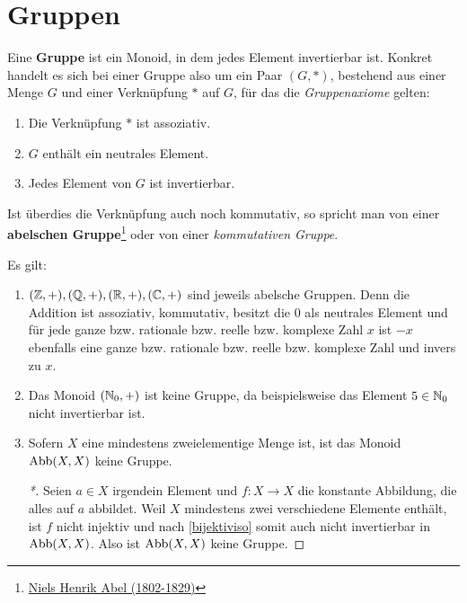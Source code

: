 \section{Gruppen}


\begin{defin}[Gruppe]  
    Eine \textbf{Gruppe} ist ein Monoid, in dem jedes Element invertierbar ist. Konkret handelt es sich bei einer Gruppe also um ein Paar $(G,*)$, bestehend aus einer Menge $G$ und einer Verknüpfung $*$ auf $G$, für das die \emph{Gruppenaxiome} gelten:
    \begin{enumerate}[(G1), labelindent=1.5em, leftmargin=*]
        \item Die Verknüpfung $*$ ist assoziativ.
        \item $G$ enthält ein neutrales Element.
        \item Jedes Element von $G$ ist invertierbar.
    \end{enumerate}
    Ist überdies die Verknüpfung auch noch kommutativ, so spricht man von einer \textbf{abelschen Gruppe}\footnote{\href{https://de.wikipedia.org/wiki/Niels_Henrik_Abel}{Niels Henrik Abel (1802-1829)}} oder von einer \emph{kommutativen Gruppe}.
\end{defin}


\begin{bsp}
    Es gilt:
    \begin{enumerate}
        \item $(\mathbb Z,+),(\mathbb Q,+),(\mathbb R,+),(\mathbb C,+)$ sind jeweils abelsche Gruppen. Denn die Addition ist assoziativ, kommutativ, besitzt die $0$ als neutrales Element und für jede ganze bzw. rationale bzw. reelle bzw. komplexe Zahl $x$ ist $-x$ ebenfalls eine ganze bzw. rationale bzw. reelle bzw. komplexe Zahl und invers zu $x$.
        \item Das Monoid $(\mathbb N_0,+)$ ist keine Gruppe, da beispielsweise das Element $5\in \mathbb N_0$ nicht invertierbar ist.
        \item Sofern $X$ eine mindestens zweielementige Menge ist, ist das Monoid $\operatorname{Abb}(X,X)$ keine Gruppe.
        \begin{proof}[*]
            Seien $a\in X$ irgendein Element und $f:X\to X$ die konstante Abbildung, die alles auf $a$ abbildet. Weil $X$ mindestens zwei verschiedene Elemente enthält, ist $f$ nicht injektiv und nach \cref{bijektiviso} somit auch nicht invertierbar in $\operatorname{Abb}(X,X)$. Also ist $\operatorname{Abb}(X,X)$ keine Gruppe.
        \end{proof}
    \end{enumerate}
\end{bsp}


